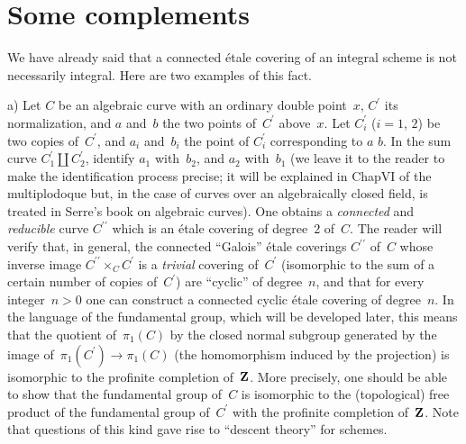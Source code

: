 \section{Some complements}
\label{I.11}

We have already said that a connected \'etale covering
of an integral scheme is not necessarily integral.
Here are two examples of this fact.

a) Let $C$ be an algebraic curve with an ordinary double
point~$x$, $C^\prime$ its normalization, and $a$ and~$b$
the two points of~$C^\prime$ above~$x$. Let $C_i^\prime$
($i=1$, $2$) be two copies of~$C^\prime$, and $a_i$
and~$b_i$ the point of $C_i^\prime$ corresponding to $a$
\resp $b$. In the sum curve $C_1^\prime\amalg C_2^\prime$,
identify $a_1$ with~$b_2$, and $a_2$ with~$b_1$ (we leave
it to the reader to make the identification process
precise; it will be explained in Chap\ptbl VI of the
multiplodoque but, in the case of curves over an
algebraically closed field, is treated in Serre's book
on algebraic curves). One obtains a \emph{connected}
and \emph{reducible} curve $C^{\prime\prime}$ which is
an \'etale covering of degree~$2$ of~$C$. The reader
will verify that, in general, the connected ``Galois''
\'etale coverings $C^{\prime\prime}$ of~$C$ whose inverse
image $C^{\prime\prime}\times_C C^\prime$ is a
\emph{trivial} covering of~$C^\prime$ (\ie isomorphic
to the sum of a certain number of copies of~$C^\prime$)
are ``cyclic'' of degree~$n$, and that for every
integer~$n>0$ one can construct a connected cyclic
\'etale covering of degree~$n$. In the language of the
fundamental group, which will be developed later,
this means that the quotient of~$\pi_1(C)$ by the
closed normal subgroup generated by the image
of~$\pi_1(C^\prime)\to\pi_1(C)$ (the homomorphism
induced by the projection) is isomorphic to the
profinite completion of~$\mathbf{Z}$. More precisely, one
should be able to show that the fundamental group
of~$C$ is isomorphic to the (topological) free product
of the fundamental group of~$C^\prime$ with the
profinite completion of~$\mathbf{Z}$. Note that questions
of this kind gave rise to ``descent theory'' for schemes.


